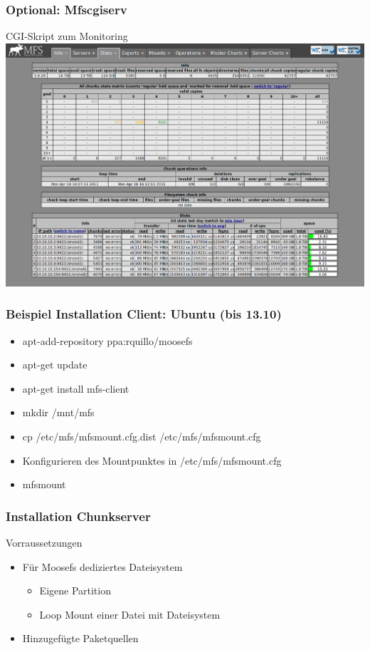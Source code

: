\documentclass{beamer}
\begin{document}
\begin{frame}
	\frametitle{Optional: Mfscgiserv}

	CGI-Skript zum Monitoring	
	\includegraphics[scale=0.2]{moosefs-status.png}
\end{frame}

\begin{frame}
	\frametitle{Beispiel Installation Client: Ubuntu (bis 13.10)}
	\begin{itemize}
		\item apt-add-repository ppa:rquillo/moosefs
		\item apt-get update
		\item apt-get install mfs-client
		\item mkdir /mnt/mfs 
		\item cp /etc/mfs/mfsmount.cfg.dist /etc/mfs/mfsmount.cfg
		\item Konfigurieren des Mountpunktes in /etc/mfs/mfsmount.cfg
		\item mfsmount
	\end{itemize}
\end{frame}

\begin{frame}
	\frametitle{Installation Chunkserver}
	\begin{block}{Vorraussetzungen} 
	\begin{itemize}
		\item F\"ur Moosefs dediziertes Dateisystem 
		\begin{itemize}
			\item Eigene Partition
			\item Loop Mount einer Datei mit Dateisystem
		\end{itemize}
		\item Hinzugef\"ugte Paketquellen
	\end{itemize}
	\end{block}

\end{frame}
\end{document}
